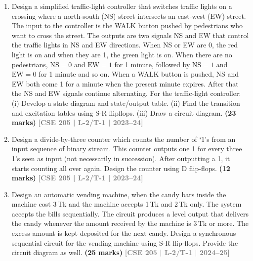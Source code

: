 \documentclass[12pt,a4paper]{article}
\newcommand{\yr}[1]{\hfill\textcolor{gray}{\small\textbf{[#1]}}}
\newcommand{\mk}[1]{\textcolor{orange!70!black}{\small\textbf{(#1 marks)}}}
\begin{document}
\begin{enumerate}

\item Design a simplified traffic-light controller that switches traffic lights on a crossing where a north-south (NS) street intersects an east-west (EW) street. The input to the controller is the WALK button pushed by pedestrians who want to cross the street. The outputs are two signals NS and EW that control the traffic lights in NS and EW directions. When NS or EW are 0, the red light is on and when they are 1, the green light is on. When there are no pedestrians, $\text{NS}=0$ and $\text{EW}=1$ for 1 minute, followed by $\text{NS}=1$ and $\text{EW}=0$ for 1 minute and so on. When a WALK button is pushed, NS and EW both come 1 for a minute when the present minute expires. After that the NS and EW signals continue alternating. For the traffic-light controller:
	(i) Develop a state diagram and state/output table.
	(ii) Find the transition and excitation tables using S-R flipflops.
	(iii) Draw a circuit diagram.
  \mk{23} \yr{CSE 205 | L-2/T-1 | 2023--24}

\item Design a divide-by-three counter which counts the number of `1's from an input sequence of binary stream. This counter outputs one 1 for every three 1's seen as input (not necessarily in succession). After outputting a 1, it starts counting all over again. Design the counter using D flip-flops.
\mk{12} \yr{CSE 205 | L-2/T-1 | 2023--24}

\item Design an automatic vending machine, when the candy bars inside the machine cost 3\,Tk and the machine accepts 1\,Tk and 2\,Tk only. The system accepts the bills sequentially. The circuit produces a level output that delivers the candy whenever the amount received by the machine is 3\,Tk or more. The excess amount is kept deposited for the next candy. Design a synchronous sequential circuit for the vending machine using S-R flip-flops. Provide the circuit diagram as well.
\mk{25} \yr{CSE 205 | L-2/T-1 | 2024--25}

\end{enumerate}
\end{document}
